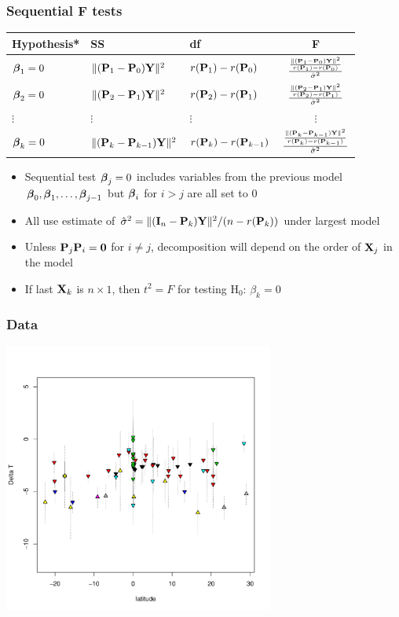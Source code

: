 \documentclass[]{beamer}
\begin{document}
\begin{frame}
  \frametitle{Sequential F tests}

  \begin{tabular}{lllc} \hline
    Hypothesis* & SS & df & F \\ \hline
$\b_1 = 0$ & $\| (\P_1 - \P_0) \Y \|^2$ & $r(\P_1) - r(\P_0)$ & $
\frac{\frac{\| (\P_1 - \P_0) \Y \|^2} {r(\P_1) - r(\P_0) }}{\shat}$
\pause \\
$\b_2 = 0$ & $\| (\P_2 - \P_1) \Y \|^2$ & $r(\P_2) - r(\P_1)$ & $ \frac{\frac{\| (\P_
2 - \P_1) \Y \|^2} {r(\P_2) - r(\P_1) }}{\shat}$  \pause \\
$\vdots$ &$\vdots$ & $\vdots$& $\vdots$ \\
 $\b_k = 0$ & $\| (\P_k - \P_{k-1}) \Y \|^2$ & $r(\P_k) - r(\P_{k-1})$ & $ \frac{\frac{\| (\P_
k - \P_{k-1}) \Y \|^2} {r(\P_k) - r(\P_{k-1}) }}{\shat}$  \pause
  \end{tabular}
  \begin{itemize}
  \item Sequential test $\b_j = 0$ includes variables from the
    previous model $\b_0, \b_1,\ldots, \b_{j-1}$ but $\b_i$ for $i >
    j$ are all set to $0$  \pause
  \item All use estimate of $\shat =  \|(\I_n -
    \P_k)\Y\|^2 /(n - r(\P_k))$ under largest model
 \pause
  \item Unless $\P_j\P_i = \zero$ for $i \neq j$, decomposition will
    depend on the order of $\X_j$ in the model  \pause
  \item If last $\X_k$ is $n\times 1$, then $t^2 = F$  for testing H$_0$:
    $\beta_k = 0$  \pause
  \end{itemize}
\end{frame}
\begin{frame}
  \frametitle{Data}
\centerline{\includegraphics[height=3.5in]{temp-lat}}
\end{frame}
\end{document}
